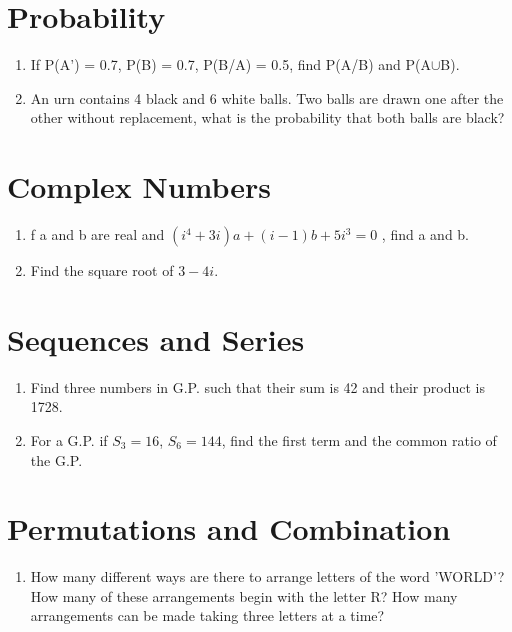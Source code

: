 \documentclass[14pt]{article}
\begin{document}
\begin{multicols}{2}
\begin{enumerate}
\end{enumerate} 


\section{Probability}
\noindent
\begin{enumerate}
\item If P(A') = 0.7, P(B) = 0.7, P(B/A) =
0.5, find P(A/B) and P(A$\cup$B).

\item An urn contains 4 black and 6 white
balls. Two balls are drawn one after the other
without replacement, what is the probability that
both balls are black?

\end{enumerate} 

\section{Complex Numbers}
\noindent
\begin{enumerate}
\item f a and b are real and
$(i^4 +3i)a + (i-1)b + 5i^3 = 0$ , find a and b.

\item Find the square root of $3 - 4i$.

\end{enumerate} 

\section{Sequences and Series}
\noindent
\begin{enumerate}
\item Find three numbers in G.P. such that their
sum is 42 and their product is 1728.

\item For a G.P. if $S_3 = 16$, $S_6 =144$, find  the first
term and the common ratio of the G.P.



\end{enumerate} 

\section{Permutations and Combination}
\noindent
\begin{enumerate}
\item How many different ways are there to
arrange letters of the word 'WORLD'? How many
of these arrangements begin with the letter R?
How many arrangements can be made taking
three letters at a time?


\end{enumerate}
\end{multicols}
\end{document}
